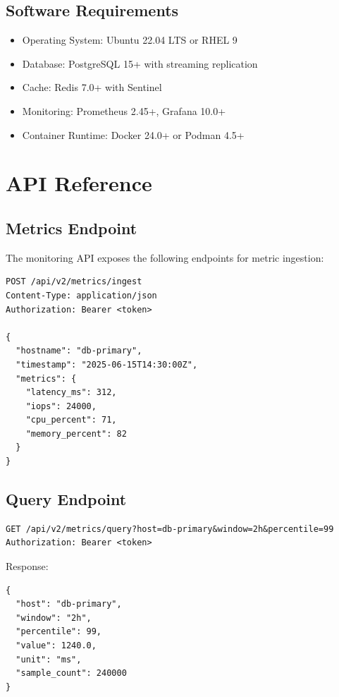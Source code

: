 \documentclass[
    language=english,
    doctype=technical-report,
    institution=none,
    titlestyle=book,
    oneside,
    loadGlossaries,
]{../../omnilatex}
\begin{document}
\section{Software Requirements}

\begin{itemize}
    \item Operating System: Ubuntu 22.04 LTS or RHEL 9
    \item Database: PostgreSQL 15+ with streaming replication
    \item Cache: Redis 7.0+ with Sentinel
    \item Monitoring: Prometheus 2.45+, Grafana 10.0+
    \item Container Runtime: Docker 24.0+ or Podman 4.5+
\end{itemize}

\chapter{API Reference}
\label{app:api}

\section{Metrics Endpoint}

The monitoring API exposes the following endpoints for metric ingestion:

\begin{verbatim}
POST /api/v2/metrics/ingest
Content-Type: application/json
Authorization: Bearer <token>

{
  "hostname": "db-primary",
  "timestamp": "2025-06-15T14:30:00Z",
  "metrics": {
    "latency_ms": 312,
    "iops": 24000,
    "cpu_percent": 71,
    "memory_percent": 82
  }
}
\end{verbatim}

\section{Query Endpoint}

\begin{verbatim}
GET /api/v2/metrics/query?host=db-primary&window=2h&percentile=99
Authorization: Bearer <token>
\end{verbatim}

Response:

\begin{verbatim}
{
  "host": "db-primary",
  "window": "2h",
  "percentile": 99,
  "value": 1240.0,
  "unit": "ms",
  "sample_count": 240000
}
\end{verbatim}
\end{document}
